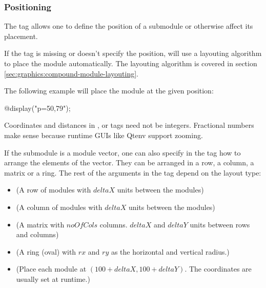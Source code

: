 \subsubsection{Positioning}
\label{sec:graphics:submodule-positioning}

The  tag allows one to define the position of a submodule or
otherwise affect its placement.

\begin{note}
If the  tag is missing or doesn't specify the position, {\opp} will
use a layouting algorithm to place the module automatically. The layouting
algorithm is covered in section \ref{sec:graphics:compound-module-layouting}.
\end{note}

The following example will place the module at the given position:

\begin{ned}
@display("p=50,79");
\end{ned}

\begin{note}
Coordinates and distances in ,  or  tags need not
be integers. Fractional numbers make sense because runtime GUIs like
Qtenv support zooming.
\end{note}

If the submodule is a module vector, one can also specify in the 
tag how to arrange the elements of the vector. They can be arranged in a
row, a column, a matrix or a ring. The rest of the arguments in the 
tag depend on the layout type:

\begin{itemize}
  \item {} (A row of modules with $deltaX$ units between the modules)
  \item {} (A column of modules with $deltaX$ units between the modules)
  \item {} (A matrix with $noOfCols$ columns.
            $deltaX$ and $deltaY$ units between rows and columns)
  \item {} (A ring (oval) with $rx$ and $ry$ as the horizontal and vertical radius.)
  \item {} (Place each module at $(100+deltaX, 100+deltaY)$.
            The coordinates are usually set at runtime.)
\end{itemize}

